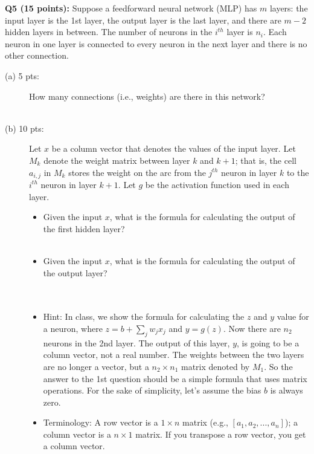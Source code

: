 \documentclass[11pt]{article}
\begin{document}
\vspace{0.4in}
\noindent
{\bf Q5 (15 points):} Suppose a feedforward neural network (MLP) has
  $m$ layers: the input layer is the 1st layer, the output layer
  is the last layer, and there are $m-2$ hidden layers in between. 
  The number of neurons in the $i^{th}$ layer is $n_i$.
  Each neuron in one layer is connected to
  every neuron in the next layer and there is no other connection.
\begin{description}
\item [(a) 5 pts:] How many connections (i.e., weights) are there in
                   this network? \\ \\

\item [(b) 10 pts:] Let $x$ be a column vector that denotes the values of the
  input layer. Let $M_k$ denote the weight matrix
  between layer $k$ and $k+1$; that is, the cell $a_{i,j}$
  in $M_k$ stores
  the weight on the arc from the $j^{th}$ neuron in layer $k$
  to the $i^{th}$ neuron in layer $k+1$. Let $g$ be the activation function used
  in each layer.
  \begin{itemize}
    \item Given the input $x$, what is the formula for calculating
      the output of the first hidden layer?  \\ \\

    \item Given the input $x$, what is the formula for calculating
      the output of the output layer? \\ \\ \\
        
    \item Hint: In class, we show the formula for calculating the $z$ and $y$
          value for a neuron, where $z = b + \sum_j w_j x_j$ and $y=g(z)$.
          Now there are $n_2$ neurons in the 2nd layer.
          The output of this layer, $y$,
          is going to be a column vector, not a real number. The weights between
          the two layers are no longer a vector,
          but a $n_2 \times n_1$ matrix denoted by $M_1$. So the answer
          to the 1st question should be a simple formula
          that uses matrix operations. For the sake of simplicity, let's assume
          the bias $b$ is always zero.
        \item Terminology: A row vector is a $1 \times n$ matrix
          (e.g., $[a_1, a_2, ..., a_n]$); a column vector is
          a $n \times 1$ matrix. If you transpose a row vector, you get a
          column vector.
   \end{itemize}

\end{description}  
\end{document}
